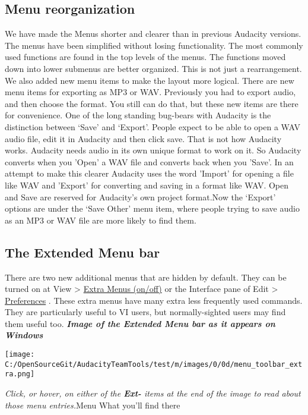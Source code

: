 \begin{multicols}{2}
\subsection{Menu reorganization}We have made the Menus shorter and clearer than in previous Audacity versions. The menus have been simplified without losing functionality. The most commonly used functions are found in the top levels of the menus. The functions moved down into lower submenus are better organized.
This is not just a rearrangement.  We also added new menu items to make the layout more logical.  There are new menu items for exporting as MP3 or WAV. Previously you had to export audio, and then choose the format. You still can do that, but these new items are there for convenience.
One of the long standing bug-bears with Audacity is the distinction between ‘Save’ and ‘Export’. People expect to be able to open a WAV audio file, edit it in Audacity and then click save. That is not how Audacity works. Audacity needs audio in its own unique format to work on it. So Audacity converts when you 'Open' a WAV file and converts back when you 'Save'. In an attempt to make this clearer Audacity uses the word 'Import' for opening a file like WAV and 'Export' for converting and saving in a format like WAV. Open and Save are reserved for Audacity's own project format.Now the ‘Export’ options are under the ‘Save Other’ menu item, where people trying to save audio as an MP3 or WAV file are more likely to find them.
\label{newXfeaturesXinXthisXreleaseXextendedmenubar}
\subsection{The Extended Menu bar}There are two new additional menus that are hidden by default.  They can be turned on at View > 
\hyperref[\foo{viewXmenuXextraXmenusXonoff}]{Extra Menus (on/off)}
 or the Interface pane of Edit > 
\hyperref[\foo{interfaceXpreferencesX}]{Preferences}
.
These extra menus have many extra less frequently used commands.  They are particularly useful to VI users, but normally-sighted users may find them useful too.
\textit{\textbf{Image of the Extended Menu bar as it appears on Windows}}\par \protect\texttt{[image: C:/OpenSourceGit/AudacityTeamTools/test/m/images/0/0d/menu\_toolbar\_extra.png]}\par \textit{Click, or hover, on either of the \textbf{Ext-} items at the end of the image to read about those menu entries.}Menu
What you'll find there


\end{multicols}
